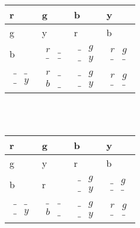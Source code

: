 \documentclass[a4paper]{article}
\begin{document}
\begin{tabular}{|l|l|l|l|}
\hline
r & g & b & y \\ \hline
g & y & r & b \\ \hline
b & $\begin{matrix}   r & \_ \\   \_ & \_  \end{matrix}$ & $\begin{matrix}   \_ & g \\   \_ & y  \end{matrix}$ & $\begin{matrix}   r & g \\   \_ & \_  \end{matrix}$ \\ \hline
$\begin{matrix}   \_ & \_ \\   \_ & y  \end{matrix}$ & $\begin{matrix}   r & \_ \\   b & \_  \end{matrix}$ & $\begin{matrix}   \_ & g \\   \_ & y  \end{matrix}$ & $\begin{matrix}   r & g \\   \_ & \_  \end{matrix}$ \\ \hline
\end{tabular}\\\\
\begin{tabular}{|l|l|l|l|}
\hline
r & g & b & y \\ \hline
g & y & r & b \\ \hline
b & r & $\begin{matrix}   \_ & g \\   \_ & y  \end{matrix}$ & $\begin{matrix}   \_ & g \\   \_ & \_  \end{matrix}$ \\ \hline
$\begin{matrix}   \_ & \_ \\   \_ & y  \end{matrix}$ & $\begin{matrix}   \_ & \_ \\   b & \_  \end{matrix}$ & $\begin{matrix}   \_ & g \\   \_ & y  \end{matrix}$ & $\begin{matrix}   r & g \\   \_ & \_  \end{matrix}$ \\ \hline
\end{tabular}\\\\
\end{document}
